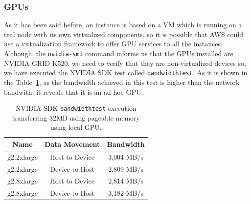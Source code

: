 \documentclass[a4paper,twoside]{article}
\begin{document}
\subsubsection{GPUs}
As it has been said before, an instance is based on a VM which is running on a real node with its own virtualized components, so it is possible that AWS could use a virtualization framework to offer GPU services to all the instances.
Although, the {\tt nvidia-smi} command informs us that the GPUs installed are NVIDIA GRID K520, we need to verify that they are non-virtualized devices so, we have executed the NVIDIA SDK test called {\tt bandwidthtest}. 
As it is shown in the Table~\ref{table:bwt}, as the bandwidth achieved in this test is higher than the network bandwith, it reveals that it is an ad-hoc GPU. 

\begin{table}[htb]
\renewcommand{\arraystretch}{1.3}
\caption{NVIDIA SDK {\tt bandwidthtest} execution transferring 32MB using pageable memory using local GPU.}
\label{table:bwt}
\tabcolsep=0.09cm
\begin{center}\begin{tabular}{ccc}
Name &  Data Movement & Bandwidth \\ \hline \hline
g2.2xlarge & Host to Device & 3,004 MB/s \\ \hline
g2.2xlarge & Device to Host & 2,809 MB/s\\ \hline
g2.8xlarge & Host to Device & 2,814 MB/s\\ \hline
g2.8xlarge & Device to Host & 3,182 MB/s\\ \hline
\end{tabular}\end{center}\end{table}
\end{document}
